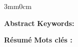 \makeatletter
\thispagestyle{plain}

\begin{changemargin}{3mm}{0cm}
    \begin{minipage}[c]{0.96\columnwidth}

        {\LARGE\textbf{Abstract}}
        \vskip2mm
        \begingroup
            \large
            \@englishAbstract
        \endgroup
        \vskip2mm
        {\textbf{Keywords: }
            \begingroup
                \@englishAbstractKeywords
            \endgroup
        }

        \vskip20mm

        {\LARGE\textbf{R\'esum\'e}}
        \vskip2mm
        \begingroup
            \large
            \@frenchAbstract
        \endgroup
        \vskip2mm
        {\textbf{Mots cl\'es : }
            \begingroup
                \@frenchAbstractKeywords
            \endgroup
        }

    \end{minipage}
\end{changemargin}
\makeatother
